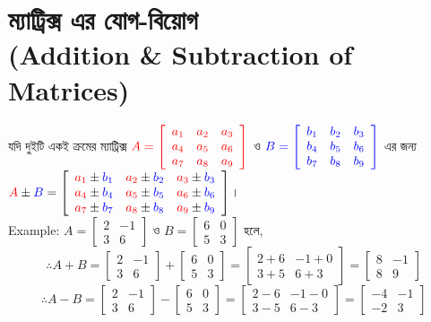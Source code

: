 \section{ম্যাট্রিক্স এর যোগ-বিয়োগ \\(Addition \& Subtraction of Matrices)}
যদি দুইটি একই ক্রমের ম্যাট্রিক্স 
$\color{red} A=
\left[\begin{array}{ccc}
a_1 & a_2 & a_3\\
a_4 & a_5 & a_6\\
a_7 & a_8 & a_9
\end{array}\right]$ ও $\color{blue}B=
\left[\begin{array}{ccc}
b_1 & b_2 & b_3\\
b_4 & b_5 & b_6\\
b_7 & b_8 & b_9
\end{array}\right]$ এর জন্য $\textcolor{red}{A}\pm \textcolor{blue}{B}=
\def \ra#1b#2{\textcolor{red}{a_{#1}}\pm\textcolor{blue}{b_{#2}}}
\left[\begin{array}{ccc}
\ra1b1 & \ra2b2 & \ra3b3\\
\ra4b4 & \ra5b5 & \ra6b6\\
\ra7b7 & \ra8b8 & \ra9b9
\end{array}\right]$।\\ Example: $
A=\left[\begin{array}{rr}
2 & -1 \\
3 & 6 
\end{array}\right]
$ ও $B=\left[\begin{array}{rr}
6 & 0 \\
5 & 3
\end{array}\right]$ হলে, $$\therefore A+B=\left[\begin{array}{rr}
2 & -1 \\
3 & 6 
\end{array}\right]+\left[\begin{array}{rr}
6 & 0 \\
5 & 3
\end{array}\right]=\left[\begin{array}{rr}
2+6 & -1+0 \\
3+5 & 6+3
\end{array}\right]=\left[\begin{array}{rr}
8 & -1\\
8 & 9
\end{array}\right]$$ 
$$\therefore A-B=\left[\begin{array}{rr}
2 & -1\\
3 & 6
\end{array}\right]-\left[\begin{array}{rr}
6 & 0\\
5 & 3
\end{array}\right]=\left[\begin{array}{rr}
2-6 & -1-0 \\
3-5 & 6-3 
\end{array}\right]=\left[\begin{array}{rr}
-4 & -1\\
-2 & 3
\end{array}\right]$$
\newpage
